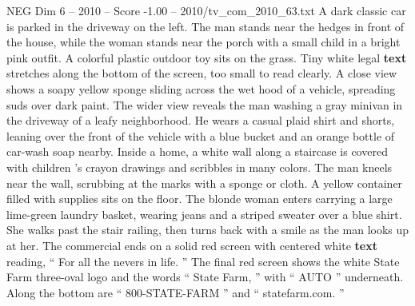 \begin{textsample}{NEG Dim 6 – 2010 – Score -1.00 – 2010/tv\_com\_2010\_63.txt}
A dark classic car is parked in the driveway on the left.
The man stands near the hedges in front of the house, while the woman stands near the porch with a small child in a bright pink outfit.
A colorful plastic outdoor toy sits on the grass.
Tiny white legal \textbf{text} stretches along the bottom of the screen, too small to read clearly.
A close view shows a soapy yellow sponge sliding across the wet hood of a vehicle, spreading suds over dark paint.
The wider view reveals the man washing a gray minivan in the driveway of a leafy neighborhood.
He wears a casual plaid shirt and shorts, leaning over the front of the vehicle with a blue bucket and an orange bottle of car-wash soap nearby.
Inside a home, a white wall along a staircase is covered with children ’s crayon drawings and scribbles in many colors.
The man kneels near the wall, scrubbing at the marks with a sponge or cloth.
A yellow container filled with supplies sits on the floor.
The blonde woman enters carrying a large lime-green laundry basket, wearing jeans and a striped sweater over a blue shirt.
She walks past the stair railing, then turns back with a smile as the man looks up at her.
The commercial ends on a solid red screen with centered white \textbf{text} reading, “ For all the nevers in life. ” The final red screen shows the white State Farm three-oval logo and the words “ State Farm, ” with “ AUTO ” underneath.
Along the bottom are “ 800-STATE-FARM ” and “ statefarm.com. ”

\end{textsample}
